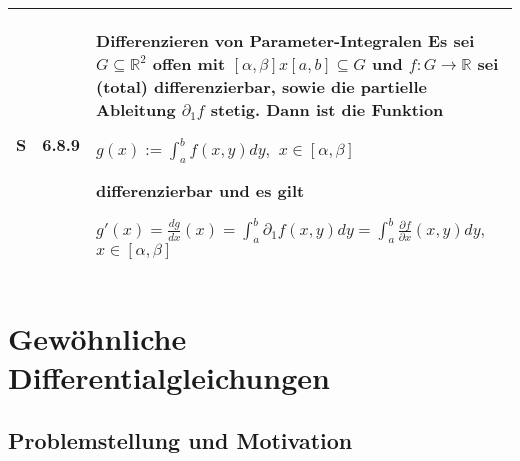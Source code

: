 \begin{longtable}{p{0.75cm} p{1cm} p{16cm}}
        \midrule
        S   & 6.8.9 &   \textbf{Differenzieren von Parameter-Integralen} \hfill \break
                        Es sei $G \subseteq \mathbb{R}^2$ offen mit $[\alpha, \beta] x [a,b] \subseteq G$ und $f: G \rightarrow \mathbb{R}$ sei 
                        (total) differenzierbar, sowie die partielle Ableitung $\partial_1 f$ stetig. Dann ist die Funktion \hfill \break
                        \centerline{$ g(x) := \int_a^b f(x,y) dy,$ $x \in [\alpha, \beta] $}
                        differenzierbar und es gilt \hfill \break
                        \centerline{$ g'(x) = \frac{dg}{dx}(x) = \int_a^b \partial_1 f(x,y) dy = \int_a^b \frac{\partial f}{\partial x}(x,y)dy,$
                        $x \in [\alpha, \beta]$} \\

        \bottomrule
    \end{longtable}

\pagebreak

\section{Gewöhnliche Differentialgleichungen}
\subsection{Problemstellung und Motivation}

